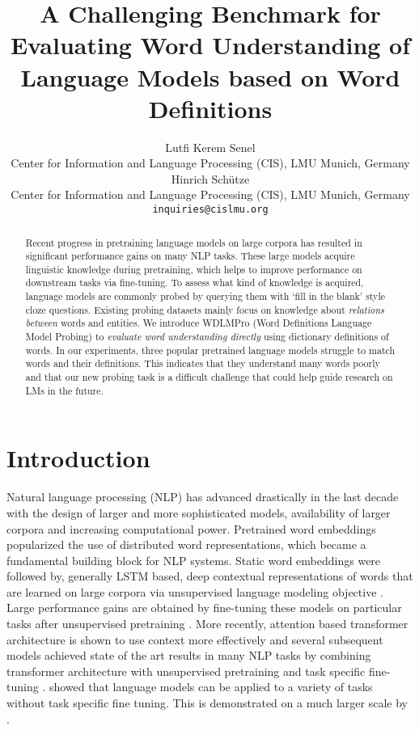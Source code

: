 \documentclass[11pt,a4paper]{article}
\title{%
A Challenging Benchmark for Evaluating Word Understanding of Language Models based on Word Definitions}
\author{Lutfi Kerem Senel \\
  Center for Information and Language Processing (CIS), LMU Munich, Germany \\
  Hinrich Schütze \\
    Center for Information and Language Processing (CIS), LMU Munich, Germany \\
  \texttt{inquiries@cislmu.org} \\
  }
\date{}
\begin{document}
\maketitle
\begin{abstract}

Recent progress in pretraining language models on large
corpora has resulted in significant performance gains on many NLP
tasks. These large models acquire linguistic knowledge
during pretraining, which helps to improve
performance on downstream tasks via fine-tuning. To assess
what kind of knowledge is acquired,
language models are commonly probed by querying them with
`fill in the blank' style cloze questions. Existing probing
datasets mainly focus on knowledge about \emph{relations between}
words and entities. We introduce WDLMPro
(Word Definitions Language Model Probing) to \emph{evaluate word understanding
  directly} using dictionary definitions of
words. In our experiments, three popular pretrained
language models
struggle to match words and their  definitions. This
indicates that they understand many words poorly and that
our new probing task is a difficult challenge that could
help guide research on LMs in the future.
\end{abstract}



\section{Introduction}

Natural language processing (NLP)  has advanced drastically
in the last decade with the design of larger and more
sophisticated models, availability of larger
corpora and increasing computational
power. Pretrained word embeddings
\cite{mikolov13word2vec_b, pennington14glove} popularized
the use of distributed word representations, which became a
fundamental building block for NLP systems. Static word
embeddings were followed by, generally LSTM based, deep
contextual representations of words that are learned on
large corpora via unsupervised language modeling objective
\cite{peters18ELMO}. Large performance gains are obtained
by fine-tuning these models on particular tasks after
unsupervised pretraining \cite{radford18fineTuning,
  howard18ULMFiT}. More recently, attention based
transformer architecture is shown to use context more
effectively \cite{vaswani17transformers} and several
subsequent models achieved state of the art results in many
NLP tasks by combining transformer architecture with
unsupervised pretraining and task specific fine-tuning
\cite{devlin19BERT, liu19RoBERTa}. 
showed that language models can be applied to a variety of
tasks without task specific fine tuning. This is demonstrated on a much larger scale by . 
\end{document}
